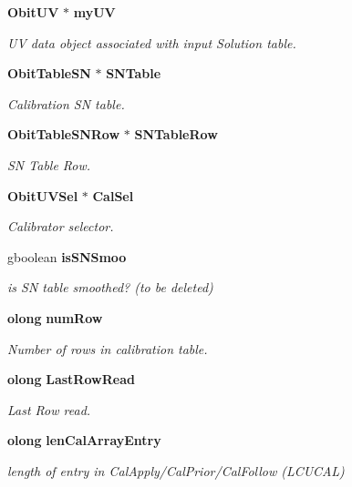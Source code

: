 \begin{CompactItemize}
{\bf Obit\-UV} $\ast$ {\bf my\-UV}
\begin{CompactList}\small\item\em UV data object associated with input Solution table. \item\end{CompactList}\item 
{\bf Obit\-Table\-SN} $\ast$ {\bf SNTable}
\begin{CompactList}\small\item\em Calibration SN table. \item\end{CompactList}\item 
{\bf Obit\-Table\-SNRow} $\ast$ {\bf SNTable\-Row}
\begin{CompactList}\small\item\em SN Table Row. \item\end{CompactList}\item 
{\bf Obit\-UVSel} $\ast$ {\bf Cal\-Sel}
\begin{CompactList}\small\item\em Calibrator selector. \item\end{CompactList}\item 
gboolean {\bf is\-SNSmoo}
\begin{CompactList}\small\item\em is SN table smoothed? (to be deleted) \item\end{CompactList}\item 
{\bf olong} {\bf num\-Row}
\begin{CompactList}\small\item\em Number of rows in calibration table. \item\end{CompactList}\item 
{\bf olong} {\bf Last\-Row\-Read}
\begin{CompactList}\small\item\em Last Row read. \item\end{CompactList}\item 
{\bf olong} {\bf len\-Cal\-Array\-Entry}
\begin{CompactList}\small\item\em length of entry in Cal\-Apply/Cal\-Prior/Cal\-Follow (LCUCAL) \item\end{CompactList}\item 

\end{CompactItemize}
